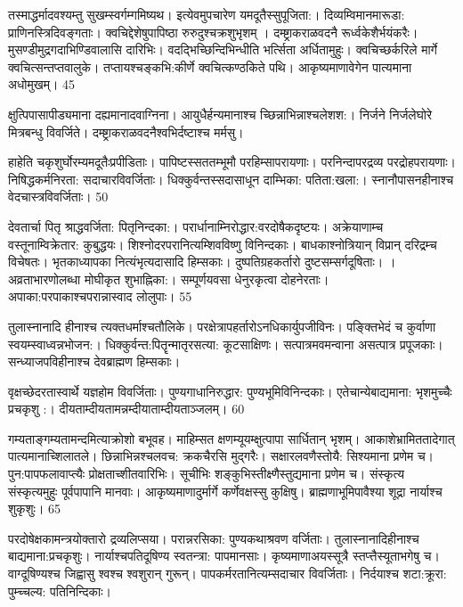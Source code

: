   तस्माद्धर्मादवश्यम्तु सुखम्स्वर्गम्गमिष्यथ।
 इत्येवमुपचारेण यमदूतैस्सुपूजिता:।
 दिव्यम्विमानमारूडा: प्राणिनस्त्रिदिवङ्गताः।
 क्वचिद्देशेषुपापिष्ठा रुरुदुश्चक्रशुभृशम् ।
 दम्ष्ट्राकराळवदनै रूर्ध्वकेशैर्भयंकरैः।
 मुसण्डीमुद्रगदाभिण्डिवालासि दारिभिः।
 वदद्भिच्छिन्दिभिन्धीति भर्त्सिता अर्धितामुहुः।
 क्वचिच्छर्करिले मार्गे क्वचित्सन्तप्तवालुके।
 तप्तायश्चङ्कभि:कीर्णे क्वचित्कण्ठकिते पथि।
 आकृष्यमाणावेगेन पात्यमाना अधोमुखम्।
 45

  क्षुत्पिपासापीड्यमाना दह्यमानादवाग्निना।
 आयुधैर्हन्यमानाश्च च्छिन्नाभिन्नाश्चलेशश:।
 निर्जने निर्जलेघोरे मित्रबन्धु विवर्जिते।
 दम्ष्ट्राकराळवदनैश्वभिर्दष्टाश्च मर्मसु।
 

हाहेति चकृशुर्घोरम्यमदूतैःप्रपीडिताः।
 पापिष्टस्सततम्भूमौ परहिम्सापरायणाः।
 परनिन्दापरद्रव्य परद्रोहपरायणाः।
 निषिद्धकर्मनिरता: सदाचारविवर्जिताः।
 धिक्कुर्वन्तस्सदासाधून दाम्भिका: पतिता:खला:।
 स्नानौपासनहीनाश्च वेदचास्त्रविवर्जिताः।
 50

  देवतार्चा पितृ श्राद्धवर्जिता: पितृनिन्दका:।
 परार्धानाम्निरोद्धार:वरदोषैकदृष्टयः।
 अक्रेयाणाम्च वस्तूनाम्विक्रेतार: कुबुद्धयः।
 शिश्नोदरपरानित्यम्शिवविष्णु विनिन्दकाः।
 बाधकाश्नोत्रियान् विप्रान् दरिद्रम्च विचेषतः।
 भृतकाध्यापका नित्यंभृत्यदासादि हिम्सकाः।
 दुष्पतिग्रहकर्तारो दुष्टसम्सर्गदूषिताः।
 ।
 अव्रताभारणोलब्धा मोघीकृत शुभाह्निका:।
 सम्पूर्णयवसा धेनुरकृत्वा दोहनेरताः।
 अपाका:परपाकाश्चपरान्नास्वाद लोलुपाः।
 55

  तुलास्नानादि हीनाश्च त्यक्तधर्माश्चतौलिके।
 परक्षेत्रापहर्तारोऽनधिकार्युपजीविनः।
 पङ्क्तिभेदं च कुर्वाणा स्वयम्स्वाध्वन्नभोजन:।
 धिक्कुर्वन्त:पितॄन्मातृरसत्या: कूटसाक्षिणः।
 सत्पात्रमवमन्वाना असत्पात्र प्रपूजकाः।
 सन्ध्याजपविहीनाश्च देवब्राह्मण हिम्सकाः।
 

वृक्षच्छेदरतास्वार्थे यज्ञहोम विवर्जिताः।
 पुण्यगाधानिरुद्धार: पुण्यभूमिविनिन्दकाः।
 एतेचान्येबाद्यमाना: भृशमुच्चैः प्रचकृशु :।
 दीयताम्दीयतामन्नम्दीयाताम्दीयताञ्जलम्।
 60

  गम्यताङ्गम्यतामन्दमित्याक्रोशो बभूवह।
 माहिम्सत क्षणम्यूयम्क्षुत्पापा सार्धितान् भृशम्।
 आकाशेभ्रामिततादेगात् पात्यमानाच्शिलातले।
 छिन्नाभिन्नश्चलवच: क्रकचैरसि मुद्गरैः।
 सक्षारलवणैस्तोयै: सिश्यमाना प्रणेम च।
 पुन:पापफलावाप्त्यैः प्रोक्षताच्शीतवारिभिः।
 सूचीभिः शङ्कुभिस्तीक्ष्णैस्तुद्यमाना प्रणेम च।
 संस्कृत्य संस्कृत्यमुहुः पूर्वपापानि मानवाः।
 आकृष्यमाणादुर्मार्गे कर्णेवक्षस्सु कुक्षिषु।
 ब्राह्मणाभूमिपावैश्या शूद्रा नार्याश्च शुकृशुः।
 65

  परदोषेक्षकामन्त्रयोक्तारो द्रव्यलिप्सया।
 परान्नरसिका: पुण्यकथाश्रवण वर्जिताः।
 तुलास्नानादिहीनाश्च बाद्यमाना:प्रचकृशुः।
 नार्याश्चपतिदूषिण्य स्वतन्त्रा: पापमानसाः।
 कृष्यमाणाअयस्सूत्रै स्तप्त्तैस्यूताभगेषु च।
 वाग्दूषिण्यश्च जिह्वासु श्वश्च श्वशुरान् गुरून्।
 पापकर्मरतानित्यम्सदाचार विवर्जिताः।
 निर्दयाश्च शटा:क्रूरा: पुम्च्चल्य: पतिनिन्दिकाः।
 

